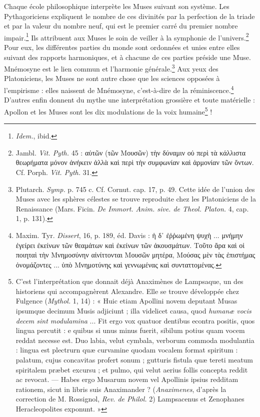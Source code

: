 \documentclass[landscape, a4paper, 11pt, oneside, polutonikogreek, french]{article}
\begin{document}
Chaque école philosophique interprète les Muses suivant son système. Les Pythagoriciens expliquent le nombre de ces divinités par la perfection de la triade et par la valeur du nombre neuf, qui est le premier carré du premier nombre impair.\footnote{\emph{Idem.}, ibid.} Ils attribuent aux Muses le soin de veiller à la symphonie de l'univers.\footnote{Jambl. \emph{Vit. Pyth.} 45 : αὐτῶν (τῶν Μουσῶν) τὴν δύναμιν οὐ περὶ τὰ κάλλιστα θεωρήματα μόνον ἀνήκειν ἀλλὰ καὶ περὶ τὴν συμφωνίαν καὶ ἁρμονίαν τῶν ὄντων. Cf. Porph. \emph{Vit. Pyth.} 31.} Pour eux, les différentes parties du monde sont ordonnées et unies entre elles suivant des rapports harmoniques, et à chacune de ces parties préside une Muse. Mnémosyne est le lien commun et l'harmonie générale.\footnote{Plutarch. \emph{Symp.} p. 745 c. Cf. Cornut. cap. 17, p. 49. Cette idée de l'union des Muses avec les sphères célestes se trouve reproduite chez les Platoniciens de la Renaissance (Mars. Ficin. \emph{De Immort. Anim. sive. de Theol. Platon.} 4, cap. 1, p. 131).} Aux yeux des Platoniciens, les Muses ne sont autre chose que les sciences opposées à l'empirisme : elles naissent de Mnémosyne, c'est-à-dire de la réminiscence.\footnote{Maxim. Tyr. \emph{Dissert}, 16, p. 189, éd. Davis : ἡ δ᾽ ἐῤῥωμένη ψυχὴ ... μνήμην ἐγείρει ἐκείνων τῶν θεαμάτων καὶ ἐκείνων τῶν ἀκουσμάτων. Τοῦτο ἄρα καὶ οἱ ποιηταὶ τὴν Μνημοσύνην αἰνίττονται Μουσῶν μητέρα, Μούσας μὲν τὰς ἐπιστήμας ὀνομάζοντες ... ὑπὸ Μνημοτύνης καὶ γεννωμένας καὶ συνταττομένας.} D'autres enfin donnent du mythe une interprétation grossière et toute matérielle : Apollon et les Muses sont les dix modulations de la voix humaine\footnote{C'est l'interprétation que donnait déjà Anaximènes de Lampsaque, un des historiens qui accompagnèrent Alexandre. Elle se trouve développée chez Fulgence (\emph{Mythol.} 1, 14) : « Huic etiam Apollini novem deputant Musas ipsumque decimum Musis adjiciunt ; illa videlicet causa, quod \emph{humanæ vocis decem sint modulamina} ... Fit ergo vox quatuor dentibus econtra positis, quos lingua percutit : e quibus si unus minus fuerit, sibilum potius quam vocem reddat necesse est. Duo labia, velut cymbala, verborum commoda modulantia : lingua est plectrurn quæ curvamine quodam vocalem format spiritum : palatum, cujus concavitas profert sonum ; gutturis fistula quæ tereti meatum spiritalem præbet excursu ; et pulmo, qui velut aerius follis concepta reddit ac revocat. --- Habes ergo Musarum novem vel Apollinis ipsius redditam rationem, sicut in libris suis Anaximander ? (\emph{Anaximenes}, d'après la correction de M. Rossignol, \emph{Rev. de Philol.} 2) Lampsacenus et Zenophanes Heracleopolites exponunt. »} !
\end{document}
